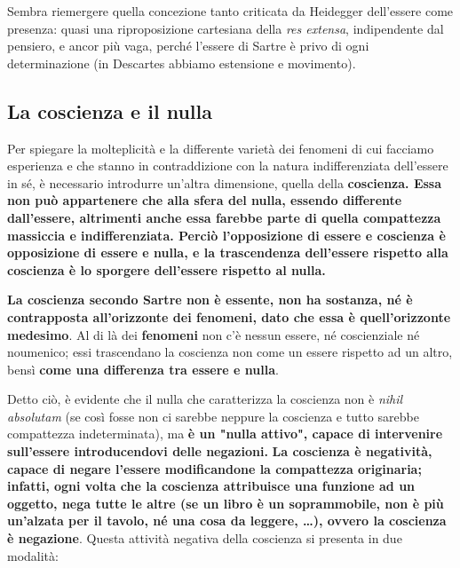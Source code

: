 Sembra riemergere quella concezione tanto criticata da
Heidegger dell'essere come presenza: quasi una
riproposizione cartesiana della \textit{res extensa},
indipendente dal pensiero, e ancor più vaga, perché
l'essere di Sartre è privo di ogni determinazione
(in Descartes abbiamo estensione e movimento).

\subsection{La coscienza e il nulla}

Per spiegare la molteplicità e la differente varietà
dei fenomeni di cui facciamo esperienza e
che stanno in contraddizione con la natura
indifferenziata dell'essere in sé, è necessario
introdurre un'altra dimensione, quella della
\textbf{coscienza.
Essa non può appartenere che alla
sfera del nulla, essendo differente dall'essere,
altrimenti anche essa farebbe parte di quella
compattezza massiccia e indifferenziata.
Perciò l'opposizione di essere e coscienza è opposizione
di essere e nulla, e la trascendenza dell'essere rispetto
alla coscienza è lo sporgere dell'essere rispetto
al nulla.}

\textbf{La coscienza secondo Sartre non è essente, non ha
sostanza, né è contrapposta all'orizzonte dei fenomeni,
dato che essa è quell'orizzonte medesimo}. Al di
là dei \textbf{fenomeni} non c'è nessun essere, né
coscienziale né noumenico; essi trascendano la
coscienza non come un essere rispetto ad un altro,
bensì \textbf{come una differenza tra essere e nulla}.

Detto ciò, è evidente che il nulla che caratterizza la coscienza non è
\textit{nihil absolutam} (se così fosse non ci sarebbe
neppure la coscienza e tutto sarebbe compattezza
indeterminata), ma \textbf{è un "nulla attivo", capace di
intervenire sull'essere introducendovi delle
negazioni.}
\textbf{La coscienza è negatività,
capace di negare l'essere modificandone la
compattezza originaria; infatti, ogni volta che la coscienza attribuisce una funzione ad un oggetto, nega tutte le altre (se un libro è un soprammobile, non è più un'alzata per il tavolo, né una cosa da leggere, \dots), ovvero la coscienza è negazione}. Questa attività
negativa della coscienza si presenta in due
modalità:

